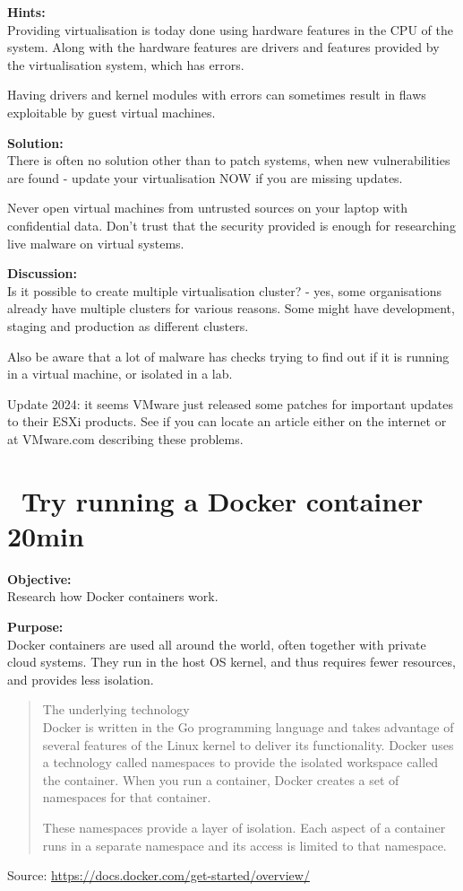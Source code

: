 \documentclass[a4paper,11pt,notitlepage]{report}
\begin{document}
{\bf Hints:}\\
Providing virtualisation is today done using hardware features in the CPU of the system. Along with the hardware features are drivers and features provided by the virtualisation system, which has errors.

Having drivers and kernel modules with errors can sometimes result in flaws exploitable by guest virtual machines.

{\bf Solution:}\\
There is often no solution other than to patch systems, when new vulnerabilities are found - update your virtualisation NOW if you are missing updates.

Never open virtual machines from untrusted sources on your laptop with confidential data. Don't trust that the security provided is enough for researching live malware on virtual systems.

{\bf Discussion:}\\
Is it possible to create multiple virtualisation cluster? - yes, some organisations already have multiple clusters for various reasons. Some might have development, staging and production as different clusters.

Also be aware that a lot of malware has checks trying to find out if it is running in a virtual machine, or isolated in a lab.

Update 2024: it seems VMware just released some patches for important updates to their ESXi products. See if you can locate an article either on the internet or at VMware.com describing these problems.




\chapter{\faInfoCircle\ Try running a Docker container 20min}
\label{ex:docker-run}


{\bf Objective:}\\
Research how Docker containers work.

{\bf Purpose:}\\
Docker containers are used all around the world, often together with private cloud systems.
They run in the host OS kernel, and thus requires fewer resources, and provides less isolation.

\begin{quote}\small
The underlying technology\\
Docker is written in the Go programming language and takes advantage of several features of the Linux kernel to deliver its functionality. Docker uses a technology called namespaces to provide the isolated workspace called the container. When you run a container, Docker creates a set of namespaces for that container.

These namespaces provide a layer of isolation. Each aspect of a container runs in a separate namespace and its access is limited to that namespace.
\end{quote}
Source: \url{https://docs.docker.com/get-started/overview/}
\end{document}

